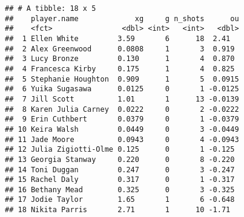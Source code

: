 \documentclass[]{article}
\newenvironment{Shaded}{\begin{snugshade}}{\end{snugshade}}
\newcommand{\DataTypeTok}[1]{\textcolor[rgb]{0.13,0.29,0.53}{#1}}
\newcommand{\KeywordTok}[1]{\textcolor[rgb]{0.13,0.29,0.53}{\textbf{#1}}}
\newcommand{\NormalTok}[1]{#1}
\newcommand{\OperatorTok}[1]{\textcolor[rgb]{0.81,0.36,0.00}{\textbf{#1}}}
\newcommand{\StringTok}[1]{\textcolor[rgb]{0.31,0.60,0.02}{#1}}
\begin{document}
\begin{Shaded}
\end{Shaded}

\begin{verbatim}
## # A tibble: 18 x 5
##    player.name             xg     g n_shots      ou
##    <fct>                <dbl> <int>   <int>   <dbl>
##  1 Ellen White         3.59       6      18  2.41  
##  2 Alex Greenwood      0.0808     1       3  0.919 
##  3 Lucy Bronze         0.130      1       4  0.870 
##  4 Francesca Kirby     0.175      1       4  0.825 
##  5 Stephanie Houghton  0.909      1       5  0.0915
##  6 Yuika Sugasawa      0.0125     0       1 -0.0125
##  7 Jill Scott          1.01       1      13 -0.0139
##  8 Karen Julia Carney  0.0222     0       2 -0.0222
##  9 Erin Cuthbert       0.0379     0       1 -0.0379
## 10 Keira Walsh         0.0449     0       3 -0.0449
## 11 Jade Moore          0.0943     0       4 -0.0943
## 12 Julia Zigiotti-Olme 0.125      0       1 -0.125 
## 13 Georgia Stanway     0.220      0       8 -0.220 
## 14 Toni Duggan         0.247      0       3 -0.247 
## 15 Rachel Daly         0.317      0       1 -0.317 
## 16 Bethany Mead        0.325      0       3 -0.325 
## 17 Jodie Taylor        1.65       1       6 -0.648 
## 18 Nikita Parris       2.71       1      10 -1.71
\end{verbatim}
\end{document}
